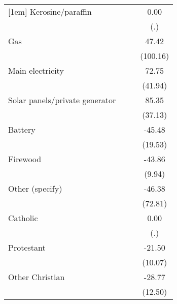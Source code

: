 {\begin{tabular}{l*{3}{c}}
[1em]
Kerosine/paraffin   &                     &                     &        0.00         \\
                    &                     &                     &         (.)         \\
[1em]
Gas                 &                     &                     &       47.42         \\
                    &                     &                     &    (100.16)         \\
[1em]
Main electricity    &                     &                     &       72.75         \\
                    &                     &                     &     (41.94)         \\
[1em]
Solar panels/private generator&                     &                     &       85.35\sym{*}  \\
                    &                     &                     &     (37.13)         \\
[1em]
Battery             &                     &                     &      -45.48\sym{*}  \\
                    &                     &                     &     (19.53)         \\
[1em]
Firewood            &                     &                     &      -43.86\sym{***}\\
                    &                     &                     &      (9.94)         \\
[1em]
Other (specify)     &                     &                     &      -46.38         \\
                    &                     &                     &     (72.81)         \\
[1em]
Catholic            &                     &                     &        0.00         \\
                    &                     &                     &         (.)         \\
[1em]
Protestant          &                     &                     &      -21.50\sym{*}  \\
                    &                     &                     &     (10.07)         \\
[1em]
Other Christian     &                     &                     &      -28.77\sym{*}  \\
                    &                     &                     &     (12.50)         \\

\end{tabular}}
